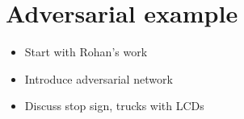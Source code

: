 \documentclass[14pt, twocolumn]{article}
\begin{document}
\section*{Adversarial example}
\begin{itemize}
	\item Start with Rohan's work 
	\item Introduce adversarial network 
	\item Discuss stop sign, trucks with LCDs 
\end{itemize}

\nocite{dumoulin2018guide}
\nocite{726791}
\nocite{43405}
\nocite{45818}
\nocite{10.5555/3086952}
\nocite{NIPS2014_5346}
\nocite{russell2016artificial}
 

\end{document}
